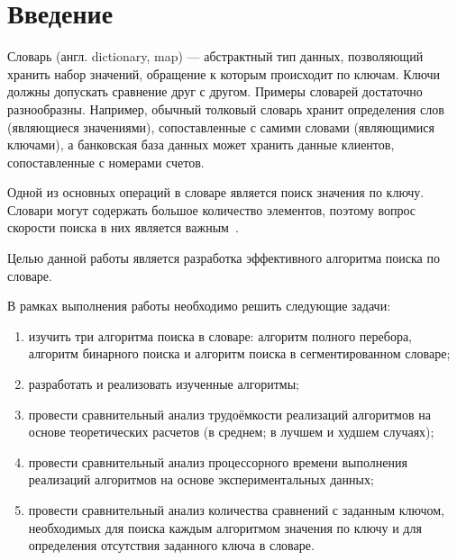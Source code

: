 \chapter*{Введение}

Словарь (англ. dictionary, map) — абстрактный тип данных, позволяющий хранить набор значений, обращение к которым происходит по ключам. Ключи должны допускать сравнение друг с другом. Примеры словарей достаточно разнообразны. Например, обычный толковый словарь хранит определения слов (являющиеся значениями), сопоставленные с самими словами (являющимися ключами), а банковская база данных может хранить данные клиентов, сопоставленные с номерами счетов.

Одной из основных операций в словаре является поиск значения по ключу. Словари могут содержать большое количество элементов, поэтому вопрос скорости поиска в них является важным~\cite{first_article}. 


Целью данной работы является разработка эффективного алгоритма поиска по словаре.


В рамках выполнения работы необходимо решить следующие задачи: 
\begin{enumerate}[label={\arabic*)}]
	\item изучить три алгоритма поиска в словаре: алгоритм полного перебора, алгоритм бинарного поиска и алгоритм поиска в сегментированном словаре;
	\item разработать и реализовать изученные алгоритмы;
	\item провести сравнительный анализ трудоёмкости реализаций алгоритмов на основе теоретических расчетов (в среднем; в лучшем и худшем случаях);
	\item провести сравнительный анализ процессорного времени выполнения реализаций алгоритмов на основе экспериментальных данных;
	\item провести сравнительный анализ количества сравнений с заданным ключом, необходимых для поиска каждым алгоритмом значения по ключу и для определения отсутствия заданного ключа в словаре.
\end{enumerate}
